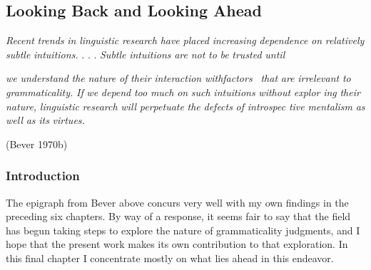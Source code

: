 \clearpage\setcounter{page}{1}\subsection[Looking Back and Looking Ahead]{Looking Back and Looking Ahead}
\begin{styleStandard}
\textit{Recent}\textit{ }\textit{trends}\textit{ }\textit{in}\textit{ }\textit{linguistic}\textit{ }\textit{research}\textit{ }\textit{have}\textit{ }\textit{placed}\textit{ }\textit{increasing}\textit{ }\textit{dependence}\textit{ }\textit{on}\textit{ }\textit{relatively}\textit{ }\textit{subtle}\textit{ }\textit{intuition}\textit{s}\textit{.}\textit{ }. . . \textit{Subtle}\textit{ }\textit{intuitions}\textit{ }\textit{are}\textit{ }\textit{not}\textit{ }\textit{to}\textit{ }\textit{be}\textit{ }\textit{trusted}\textit{ }\textit{until}
\end{styleStandard}


\begin{styleStandard}
\textit{we}\textit{ }\textit{understand}\textit{ }\textit{the}\textit{ }\textit{nature}\textit{ }\textit{of}\textit{ }\textit{their}\textit{ }\textit{interaction}\textit{ }\textit{withfactors }\textit{\ }\textit{that}\textit{ }\textit{are}\textit{ }\textit{irrelevant}\textit{ }\textit{to}\textit{ }\textit{grammaticality.}\textit{ }\textit{If}\textit{ }\textit{we}\textit{ }\textit{depend}\textit{ }\textit{too}\textit{ }\textit{much}\textit{ }\textit{on}\textit{ }\textit{such}\textit{ }\textit{intuitions}\textit{ }\textit{without}\textit{ }\textit{explor\-}\textit{ }\textit{ing}\textit{ }\textit{their}\textit{ }\textit{nature,}\textit{ }\textit{linguistic}\textit{ }\textit{research}\textit{ }\textit{will}\textit{ }\textit{perpetuate}\textit{ }\textit{the}\textit{ }\textit{defects}\textit{ }\textit{of}\textit{ }\textit{introspec\-}\textit{ }\textit{tive}\textit{ }\textit{mentalism}\textit{ }\textit{as}\textit{ }\textit{well}\textit{ }\textit{as}\textit{ }\textit{its}\textit{ }\textit{virtues.}
\end{styleStandard}


\begin{styleStandard}
(Bever 1970b)
\end{styleStandard}


\subsubsection[Introduction]{Introduction}
\begin{styleStandard}
The epigraph from Bever above concurs very well with my own findings in the preceding six chapters. By way of a response, it seems fair to say that the field has begun taking steps to explore the nature of grammaticality judgments, and I hope that the present work makes its own contribution to that exploration. In this final chapter I concentrate mostly on what lies ahead in this endeavor.
\end{styleStandard}


